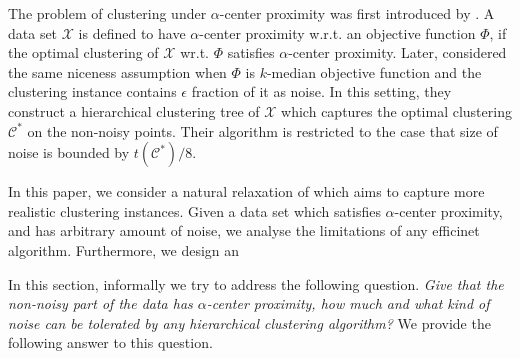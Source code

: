 \documentclass[anon,12pt]{colt2016} %
\newcommand{\mc}{\mathcal}
\begin{document}
The problem of clustering under $\alpha$-center proximity was first introduced by \cite{awasthi2012center}. A data set $\mathcal{X}$ is defined to have $\alpha$-center proximity w.r.t. an objective function $\Phi$, if the optimal clustering of $\mc{X}$ wr.t. $\Phi$ satisfies $\alpha$-center proximity.
Later, \cite{balcan2012clustering} considered the same niceness assumption when $\Phi$ is $k$-median objective function and the clustering instance contains $\epsilon$ fraction of it as noise. In this setting, they construct a hierarchical clustering tree of $\mc{X}$ which captures the optimal clustering $\mc{C}^*$ on the non-noisy points. Their algorithm is restricted to the case that size of noise is bounded by $t(\mc{C}^*)/8$.

In this paper, we consider a natural relaxation of \cite{balcan2012clustering} which aims to capture more realistic clustering instances. Given a data set which satisfies $\alpha$-center proximity, and has arbitrary amount of noise, we analyse the limitations of any efficinet algorithm. Furthermore, we design an

In this section, informally we try to address the following question. {\it Give that the non-noisy part of the data has $\alpha$-center proximity, how much and what kind of noise can be tolerated by any hierarchical clustering algorithm?} We provide the following answer to this question.
\end{document}

